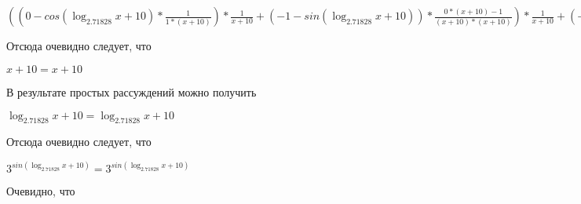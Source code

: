 \documentclass[12pt,a4paper,fleqn]{article}
\theoremstyle{definition}
\begin{document}
$(( 0  - cos(\log_{ 2.71828 }{ x  +  10 }) * \frac{ 1 }{ 1  * ( x  +  10 )}
) * \frac{ 1 }{ x  +  10 }
 + ( -1  - sin(\log_{ 2.71828 }{ x  +  10 })) * \frac{ 0  * ( x  +  10 ) -  1 }{( x  +  10 ) * ( x  +  10 )}
) * \frac{ 1 }{ x  +  10 }
 + ( -1  - sin(\log_{ 2.71828 }{ x  +  10 })) * \frac{ 1 }{ x  +  10 }
 * \frac{ 0  * ( x  +  10 ) -  1 }{( x  +  10 ) * ( x  +  10 )}
 + ( -1  - sin(\log_{ 2.71828 }{ x  +  10 })) * \frac{ 1 }{ 1  * ( x  +  10 )}
 * \frac{ -2 }{( x  +  10 ) * ( x  +  10 )}
 + cos(\log_{ 2.71828 }{ x  +  10 }) * \frac{ 0  * ( x  +  10 ) * ( x  +  10 ) -  -2  * ( 1  * ( x  +  10 ) + ( x  +  10 ) *  1 )}{( x  +  10 ) * ( x  +  10 ) * ( x  +  10 ) * ( x  +  10 )}
 = (( 0  - cos(\log_{ 2.71828 }{ x  +  10 }) * \frac{ 1 }{ 1  * ( x  +  10 )}
) * \frac{ 1 }{ x  +  10 }
 + ( -1  - sin(\log_{ 2.71828 }{ x  +  10 })) * \frac{ 0  * ( x  +  10 ) -  1 }{( x  +  10 ) * ( x  +  10 )}
) * \frac{ 1 }{ x  +  10 }
 + ( -1  - sin(\log_{ 2.71828 }{ x  +  10 })) * \frac{ 1 }{ x  +  10 }
 * \frac{ 0  * ( x  +  10 ) -  1 }{( x  +  10 ) * ( x  +  10 )}
 + ( -1  - sin(\log_{ 2.71828 }{ x  +  10 })) * \frac{ 1 }{ 1  * ( x  +  10 )}
 * \frac{ -2 }{( x  +  10 ) * ( x  +  10 )}
 + cos(\log_{ 2.71828 }{ x  +  10 }) * \frac{ 0  * ( x  +  10 ) * ( x  +  10 ) -  -2  * ( 1  * ( x  +  10 ) + ( x  +  10 ) *  1 )}{( x  +  10 ) * ( x  +  10 ) * ( x  +  10 ) * ( x  +  10 )}
$

Отсюда очевидно следует, что

$ x  +  10  =  x  +  10 $

В результате простых рассуждений можно получить

$\log_{ 2.71828 }{ x  +  10 } = \log_{ 2.71828 }{ x  +  10 }$

Отсюда очевидно следует, что

${ 3 }^{sin(\log_{ 2.71828 }{ x  +  10 })} = { 3 }^{sin(\log_{ 2.71828 }{ x  +  10 })}$

Очевидно, что
\end{document}
